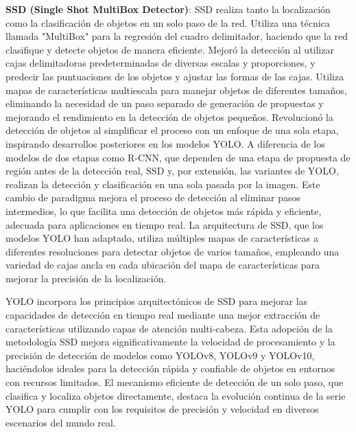 \textbf{SSD (Single Shot MultiBox Detector)}: SSD realiza tanto la localización como la clasificación de objetos en un solo paso de la red. Utiliza una técnica llamada "MultiBox" para la regresión del cuadro delimitador, haciendo que la red clasifique y detecte objetos de manera eficiente. Mejoró la detección al utilizar cajas delimitadoras predeterminadas de diversas escalas y proporciones, y predecir las puntuaciones de los objetos y ajustar las formas de las cajas. Utiliza mapas de características multiescala para manejar objetos de diferentes tamaños, eliminando la necesidad de un paso separado de generación de propuestas y mejorando el rendimiento en la detección de objetos pequeños. Revolucionó la detección de objetos al simplificar el proceso con un enfoque de una sola etapa, inspirando desarrollos posteriores en los modelos YOLO. A diferencia de los modelos de dos etapas como R-CNN, que dependen de una etapa de propuesta de región antes de la detección real, SSD y, por extensión, las variantes de YOLO, realizan la detección y clasificación en una sola pasada por la imagen. Este cambio de paradigma mejora el proceso de detección al eliminar pasos intermedios, lo que facilita una detección de objetos más rápida y eficiente, adecuada para aplicaciones en tiempo real. La arquitectura de SSD, que los modelos YOLO han adaptado, utiliza múltiples mapas de características a diferentes resoluciones para detectar objetos de varios tamaños, empleando una variedad de cajas ancla en cada ubicación del mapa de características para mejorar la precisión de la localización.

YOLO incorpora los principios arquitectónicos de SSD para mejorar las capacidades de detección en tiempo real mediante una mejor extracción de características utilizando capas de atención multi-cabeza. Esta adopción de la metodología SSD mejora significativamente la velocidad de procesamiento y la precisión de detección de modelos como YOLOv8, YOLOv9 y YOLOv10, haciéndolos ideales para la detección rápida y confiable de objetos en entornos con recursos limitados. El mecanismo eficiente de detección de un solo paso, que clasifica y localiza objetos directamente, destaca la evolución continua de la serie YOLO para cumplir con los requisitos de precisión y velocidad en diversos escenarios del mundo real\cite{sapkota2025yolo}\cite{sanchez2020evaluacion}.

